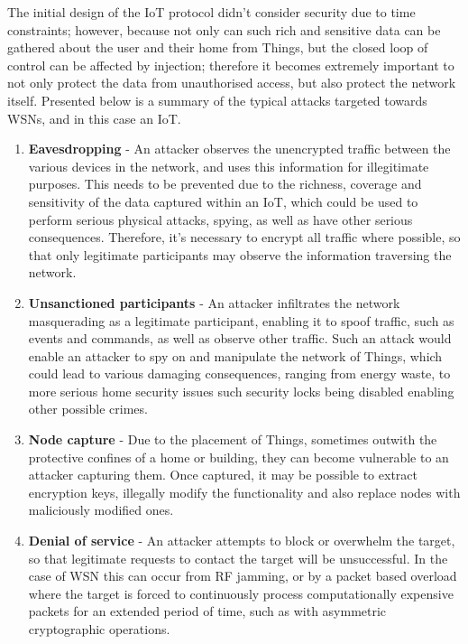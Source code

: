 \documentclass{mprop}
\begin{document}
The initial design of the IoT protocol didn't consider security due to time constraints; however, because not only can such rich and sensitive data can be gathered about the user and their home from Things, but the closed loop of control can be affected by injection; therefore it becomes extremely important to not only protect the data from unauthorised access, but also protect the network itself. 
Presented below is a summary of the typical attacks targeted towards WSNs, and in this case an IoT.
\begin{enumerate}
  \item \textbf{Eavesdropping} - An attacker observes the unencrypted traffic between the various devices in the network, and uses this information for illegitimate purposes. This needs to be prevented due to the richness, coverage and sensitivity of the data captured within an IoT, which could be used to perform serious physical attacks, spying, as well as have other serious consequences. Therefore, it's necessary to encrypt all traffic where possible, so that only legitimate participants may observe the information traversing the network.
  \item \textbf{Unsanctioned participants} - An attacker infiltrates the network masquerading as a legitimate participant, enabling it to spoof traffic, such as events and commands, as well as observe other traffic. Such an attack would enable an attacker to spy on and manipulate the network of Things, which could lead to various damaging consequences, ranging from energy waste, to more serious home security issues such security locks being disabled enabling other possible crimes.
  \item \textbf{Node capture} - Due to the placement of Things, sometimes outwith the protective confines of a home or building, they can become vulnerable to an attacker capturing them. Once captured, it may be possible to extract encryption keys, illegally modify the functionality and also replace nodes with maliciously modified ones.
  \item \textbf{Denial of service} - An attacker attempts to block or overwhelm the target, so that legitimate requests to contact the target will be unsuccessful. In the case of WSN this can occur from RF jamming, or by a packet based overload where the target is forced to continuously process computationally expensive packets for an extended period of time, such as with asymmetric cryptographic operations. 
\end{enumerate}
\end{document}
